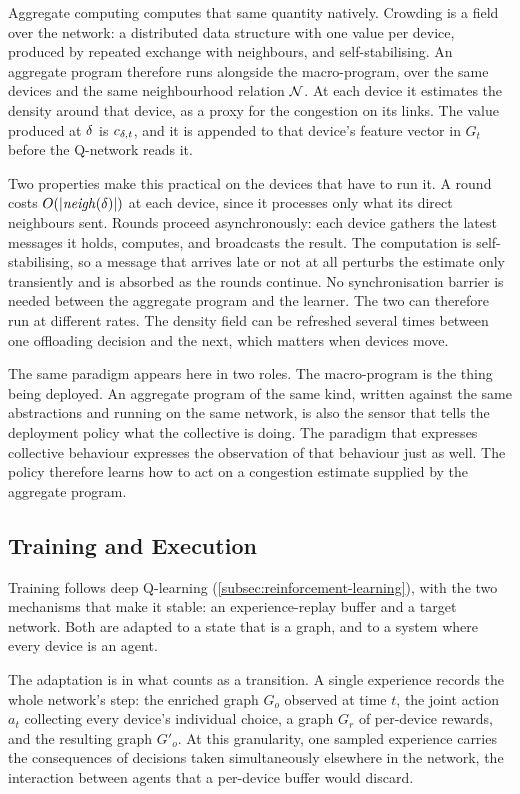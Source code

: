 Aggregate computing computes that same quantity natively.
%
Crowding is a field over the network:
a distributed data structure with one value per device,
produced by repeated exchange with neighbours,
and self-stabilising.
%
An aggregate program therefore runs alongside the macro-program, over the same devices and the same neighbourhood relation $\mathcal{N}$.
%
At each device it estimates the density around that device, as a proxy for the congestion on its links.
%
The value produced at $\delta$ is $c_{\delta,t}$,
and it is appended to that device's feature vector in $G_t$ before the Q-network reads it.

Two properties make this practical on the devices that have to run it.
%
A round costs $O(|\mathit{neigh}(\delta)|)$ at each device, since it processes only what its direct neighbours sent.
Rounds proceed asynchronously: each device gathers the latest messages it holds, computes, and broadcasts the result.
%
The computation is self-stabilising,
so a message that arrives late or not at all perturbs the estimate only transiently and is absorbed as the rounds continue.
No synchronisation barrier is needed between the aggregate program and the learner.
%
The two can therefore run at different rates.
The density field can be refreshed several times between one offloading decision and the next, which matters when devices move.

The same paradigm appears here in two roles.
%
The macro-program is the thing being deployed.
%
An aggregate program of the same kind,
written against the same abstractions and running on the same network,
is also the sensor that tells the deployment policy what the collective is doing.
%
The paradigm that expresses collective behaviour expresses the observation of that behaviour just as well.
The policy therefore learns how to act on a congestion estimate supplied by the aggregate program.

\subsection{Training and Execution}
\label{subsec:idhgql-training}

Training follows deep Q-learning (\cref{subsec:reinforcement-learning}), with the two mechanisms that make it stable:
an experience-replay buffer and a target network.
%
Both are adapted to a state that is a graph, and to a system where every device is an agent.

The adaptation is in what counts as a transition.
%
A single experience records the whole network's step:
the enriched graph $G_o$ observed at time $t$,
the joint action $a_t$ collecting every device's individual choice,
a graph $G_r$ of per-device rewards,
and the resulting graph $G'_o$.
%
At this granularity, one sampled experience carries the consequences of decisions taken simultaneously elsewhere in the network,
the interaction between agents that a per-device buffer would discard.

